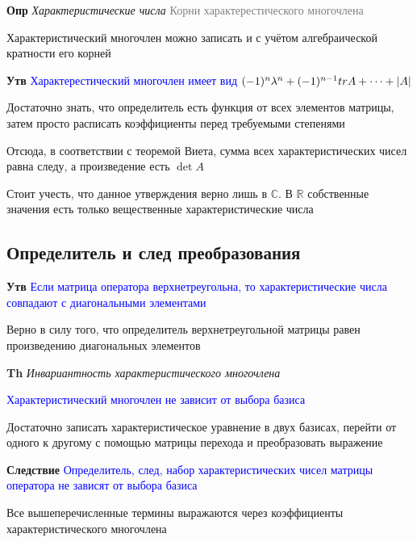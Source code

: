 \textbf{Опр} \textit{Характеристические числа} \textcolor{gray}{Корни характерестического многочлена}

Характеристический многочлен можно записать и с учётом алгебраической кратности его корней

\textbf{Утв} \textcolor{blue}{Характерестический многочлен имеет
вид $(-1)^n \lambda^n + (-1)^{n-1} tr A + \dots + \abs{A}$}

Достаточно знать, что определитель есть функция от всех элементов матрицы, затем просто расписать коэффициенты
перед требуемыми степенями

Отсюда, в соответствии с теоремой Виета, сумма всех характеристических чисел равна следу, а произведение есть $\det A$

Стоит учесть, что данное утверждения верно лишь в $\mathbb{C}$.
В $\mathbb{R}$ собственные значения есть только вещественные характеристические числа

\subsection{Определитель и след преобразования}

\textbf{Утв} \textcolor{blue}{Если матрица оператора верхнетреугольна, то характеристические числа совпадают с
диагональными элементами}

Верно в силу того, что определитель верхнетреугольной матрицы равен произведению диагональных элементов

\textbf{Th} \textit{Инвариантность характеристического многочлена}

\textcolor{blue}{Характеристический многочлен не зависит от выбора базиса}

Достаточно записать характеристическое уравнение в двух базисах, перейти от одного к другому с помощью матрицы
перехода и преобразовать выражение

\textbf{Следствие} \textcolor{blue}{Определитель, след, набор характеристических чисел матрицы оператора не
зависят от выбора базиса}

Все вышеперечисленные термины выражаются через коэффициенты характеристического многочлена